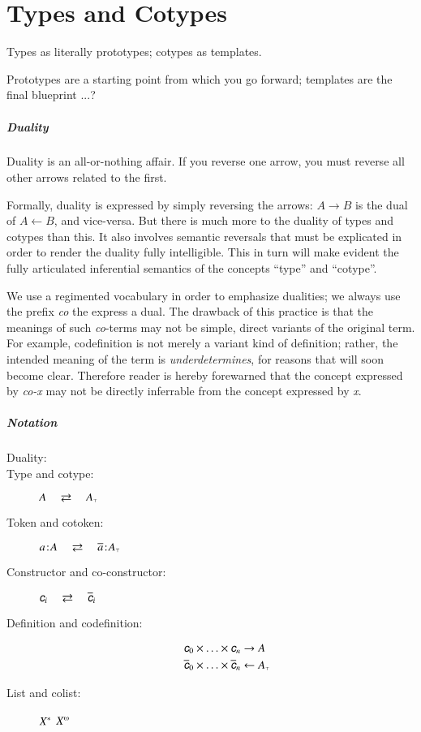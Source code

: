 \chapter{Types and Cotypes}\label{ch:types}



Types as literally prototypes; cotypes as templates.

Prototypes are a starting point from which you go forward; templates are the final blueprint ...?

\paragraph{Duality}  Duality is an all-or-nothing affair. If you reverse one arrow, you must reverse all other arrows related to the first.

Formally, duality is expressed by simply reversing the arrows:
\(A\rightarrow B\) is the dual of \(A\leftarrow B\), and vice-versa.
But there is much more to the duality of types and cotypes than this.
It also involves semantic reversals that must be explicated in order
to render the duality fully intelligible. This in turn will make
evident the fully articulated inferential semantics of the concepts
``type'' and ``cotype''.

We use a regimented vocabulary in order to emphasize dualities; we
always use the prefix \textit{co} the express a dual. The drawback of
this practice is that the meanings of such \textit{co}-terms may not
be simple, direct variants of the original term. For example,
codefinition is not merely a variant kind of definition; rather, the
intended meaning of the term is \textit{underdetermines}, for reasons
that will soon become clear. Therefore reader is hereby forewarned
that the concept expressed by \textit{co-x} may not be directly
inferrable from the concept expressed by \textit{x}.

\paragraph{Notation}

\begin{description}
\item[Duality:] \dual
\item[Type and cotype:]\hspace{2em}\(A\hspace{1em}\rightleftarrows\hspace{1em} A_{\scriptscriptstyle\top}\)
\item[Token and cotoken:] \(a\hspace{1pt}\mathpunct{:}\hspace{-1pt}A\hspace{1em}\rightleftarrows\hspace{1em}
  \overline{a}\hspace{1pt}\mathpunct{:}\hspace{-1pt}A_{\scriptscriptstyle\top}\)
    \item[Constructor and co-constructor:] \(\ctor{i}\dual \coctor{i}\)
    \item[Definition and codefinition:]

      \begin{align}
       \ctor{0}\times\ldots\times\ctor{n} & \rightarrow A \nonumber \\
       \coctor{0}\times\ldots\times\coctor{n} & \leftarrow \cotype{A} \nonumber
      \end{align}
      \item[List and colist:] \({X^{*}}\) \dual \(\colist{X}\)
\end{description}

